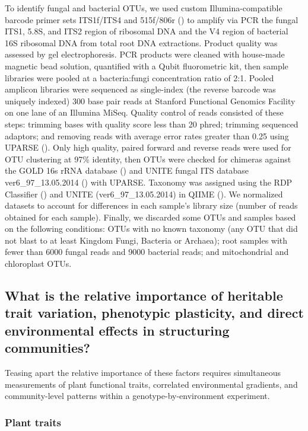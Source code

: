 \documentclass[11pt]{article}
\begin{document}
To identify fungal and bacterial OTUs, we used custom
Illumina-compatible barcode primer sets ITS1f/ITS4 and 515f/806r
(\citealt{Caporaso_2012}) to amplify via PCR the fungal ITS1, 5.8S, and ITS2
region of ribosomal DNA and the V4 region of bacterial 16S ribosomal DNA
from total root DNA extractions. Product quality was assessed by gel
electrophoresis. PCR products were cleaned with house-made magnetic bead
solution, quantified with a Qubit fluorometric kit, then sample
libraries were pooled at a bacteria:fungi concentration ratio of 2:1.
Pooled amplicon libraries were sequenced as single-index (the reverse
barcode was uniquely indexed) 300 base pair reads at Stanford Functional
Genomics Facility on one lane of an Illumina MiSeq. Quality control of
reads consisted of these steps: trimming bases with quality score less
than 20 phred; trimming sequenced adaptors; and removing reads with
average error rates greater than 0.25 using UPARSE (\citealt{Edgar_2013}).
Only high quality, paired forward and reverse reads were used for OTU
clustering at 97\% identity, then OTUs were checked for chimeras against
the GOLD 16s rRNA database (\citealt{reddy2014genomes}) and UNITE fungal ITS
database ver6\_97\_13.05.2014 (\citealt{koljalg2005unite}) with UPARSE. Taxonomy was
assigned using the RDP Classifier (\citealt{wang2007naive}) and UNITE
(ver6\_97\_13.05.2014) in QIIME (\citealt{Caporaso_2010}). We normalized datasets
to account for differences in each sample's library size (number of
reads obtained for each sample). Finally, we discarded some OTUs and
samples based on the following conditions: OTUs with no known taxonomy
(any OTU that did not blast to at least Kingdom Fungi, Bacteria or
Archaea); root samples with fewer than 6000 fungal reads and 9000
bacterial reads; and mitochondrial and chloroplast OTUs.

\subsection*{What is the relative importance of heritable trait
variation, phenotypic plasticity, and direct environmental effects in
structuring
communities?}

Teasing apart the relative importance of these factors requires
simultaneous measurements of plant functional traits, correlated
environmental gradients, and community-level patterns within a
genotype-by-environment experiment.

\subsubsection*{Plant traits}
\end{document}
